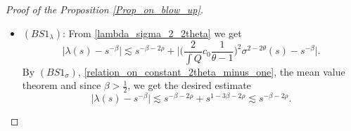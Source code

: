 \documentclass[10pt,a4paper]{amsart}
\begin{document}
\begin{proof}[Proof of the Proposition \ref{Prop_on_blow_up}]
\begin{itemize}
The initial condition \eqref{init_cond_sigma_b} on $\sigma_0$, the mean value theorem for the function $x \mapsto x^{\frac{1}{1-\beta}}$, $\frac{1}{1-\beta} > 2$ and the integration of the previous result yields
\begin{equation}
    \Big\lvert \sigma^{\frac{1}{1-\beta}}(s) - (1-\beta)^{-\frac{1}{1-\beta}} s\Big\rvert \lesssim s^{1-2\rho} \iff \Bigg\lvert \Bigg( \frac{(1-\beta)\sigma(s)}{s^{1-\beta}}\Bigg)^{\frac{1}{1-\beta}} -1  \Bigg\rvert \lesssim s^{-2\rho}.
\end{equation}
By the mean value theorem as previously, we find 
\begin{equation}
    \Bigg\lvert  \frac{(1-\beta)\sigma(s)}{s^{1-\beta}}  -1  \Bigg\rvert \lesssim s^{-2\rho} \iff \Big\lvert \sigma(s) - \frac{1}{1-\beta}s^{1-\beta} \Big\rvert \lesssim s^{1-\beta-2\rho}.
\end{equation}

\item $(BS1_\lambda)$: From \eqref{lambda_sigma_2_2theta} we get
\begin{equation}
    \Big\lvert \lambda(s) - s^{-\beta} \Big\rvert \lesssim s^{-\beta-2\rho}  + \Bigg\lvert  \Bigg( \frac{2}{\int Q}c_0 \frac{1}{\theta -1} \Bigg)^2 \sigma^{2-2\theta}(s) - s^{-\beta} \Bigg\rvert.
\end{equation}
By $(BS1_{\sigma})$, \eqref{relation_on_constant_2theta_minus_one}, the mean value theorem and since $\beta > \frac{1}{2}$, we get the desired estimate
\begin{equation}
    \Big\lvert \lambda(s) - s^{-\beta} \Big\rvert \lesssim s^{-\beta-2\rho} + s^{1-3\beta-2\rho} \lesssim s^{-\beta-2\rho}.
\end{equation}


\end{itemize}
\end{proof}
\end{document}
